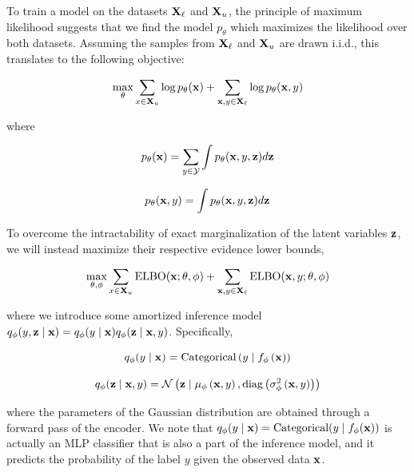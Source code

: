 To train a model on the datasets $\mathbf{X}_{\ell}$ and $\mathbf{X}_u$, the principle of maximum likelihood suggests that we find the model 
$p_{\theta}$ which maximizes the likelihood over both datasets. Assuming the samples from $\mathbf{X}_{\ell}$ and $\mathbf{X}_u$ are drawn i.i.d., 
this translates to the following objective:

\begin{equation} \label{eq:18}
    \max\limits_{\theta} \sum\limits_{x\in\mathbf{X}_u} \log p_{\theta}(\mathbf{x}) + \sum\limits_{\mathbf{x},y\in\mathbf{X}_{\ell}} \log p_{\theta}(\mathbf{x}, y)
\end{equation}

where

\begin{equation} \label{eq:19}
    p_{\theta}(\mathbf{x}) = \sum\limits_{y \in \mathcal{Y}} \int p_{\theta}(\mathbf{x},y,\mathbf{z})d\mathbf{z}
\end{equation}

\begin{equation} \label{eq:20}
    p_{\theta}(\mathbf{x}, y) = \int p_{\theta}(\mathbf{x},y,\mathbf{z})d\mathbf{z}
\end{equation}

To overcome the intractability of exact marginalization of the latent variables $\mathbf{z}$, we will instead maximize their
respective evidence lower bounds,

\begin{equation}\label{eq:21}
    \max\limits_{\theta, \phi} \sum\limits_{x\in\mathbf{X}_u} \text{ELBO}(\mathbf{x}; \theta, \phi) + \sum\limits_{\mathbf{x},y\in\mathbf{X}_{\ell}} \text{ELBO}(\mathbf{x}, y; \theta, \phi)
\end{equation}

where we introduce some amortized inference model $q_{\phi}(y,\mathbf{z} \mid \mathbf{x}) = q_{\phi}(y \mid \mathbf{x}) q_{\phi}(\mathbf{z} \mid \mathbf{x}, y)$. Specifically,

\begin{equation} \label{eq:22}
    q_{\phi}(y \mid \mathbf{x}) = \text{Categorical}\left(y \mid f_{\phi}\left(\mathbf{x}\right)\right)
\end{equation}

\begin{equation} \label{eq:23}
    q_{\phi}(\mathbf{z} \mid \mathbf{x}, y) = \mathcal{N}\left(\mathbf{z} \mid \mu_{\phi}\left(\mathbf{x}, y\right),\text{diag}\left(\sigma_{\phi}^2\left(\mathbf{x}, y\right)\right) \right)
\end{equation}

where the parameters of the Gaussian distribution are obtained through a forward pass of the encoder. We note that 
$q_{\phi}(y \mid \mathbf{x}) = \text{Categorical}(y \mid f_{\phi}(\mathbf{x}))$ is actually an MLP classifier that is also a part of the 
inference model, and it predicts the probability of the label $y$ given the observed data $\mathbf{x}$.


